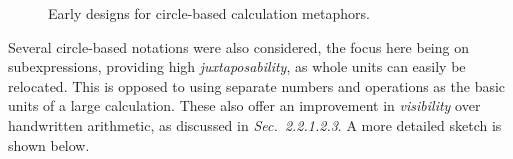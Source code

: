 \documentclass[12pt,twoside,notitlepage,xetex]{report}
\begin{document}
\begin{center}
\begin{figure}[H]
\begin{center}
{{\begin{center}
\end{center}}}
\end{center}
\caption{Early designs for circle-based calculation metaphors.}
\label{fig:Circs1}
\end{figure}
\end{center}

Several circle-based notations were also considered, the focus here being on subexpressions, providing high \emph{juxtaposability}, as whole units can easily be relocated. This is opposed to using separate numbers and operations as the basic units of a large calculation.  These also offer an improvement in \emph{visibility} over handwritten arithmetic, as discussed in \emph{Sec.~2.2.1.2.3}.  A more detailed sketch is shown below.
\end{document}
